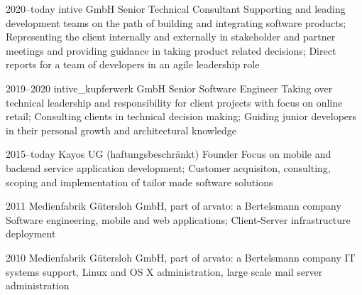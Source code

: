 \documentclass[]{friggeri-cv} %
\begin{document}
	\begin{entrylist}
		
	\entry
	{2020--today}
	{intive GmbH}
	{Senior Technical Consultant}
	{Supporting and leading development teams on the path of building and integrating software products; Representing the client internally and externally in stakeholder and partner meetings and providing guidance in taking product related decisions; Direct reports for a team of developers in an agile leadership role}
	
	
	\entry
	{2019--2020}
	{intive\_kupferwerk GmbH}
	{Senior Software Engineer}
	{Taking over technical leadership and responsibility for client projects with focus on online retail; Consulting clients in technical decision making; Guiding junior developers in their personal growth and architectural knowledge}
		
	
	\entry
	{2015--today}
	{Kayos UG (haftungsbeschr\"{a}nkt)}
	{Founder}
	{Focus on mobile and backend service application development; Customer acquisiton, consulting, scoping and implementation of tailor made software solutions}

	
	
	
	\entry
	{2011}
	{Medienfabrik G\"{u}tersloh GmbH, part of arvato: a Bertelsmann company}
	{}
	{Software engineering, mobile and web applications; Client-Server infrastructure deployment}
	
	

	
	
	\entry
	{2010}
	{Medienfabrik G\"{u}tersloh GmbH, part of arvato: a Bertelsmann company}
	{}
	{IT systems support, Linux and OS X administration, large scale mail server administration}


\end{entrylist}
\end{document}
